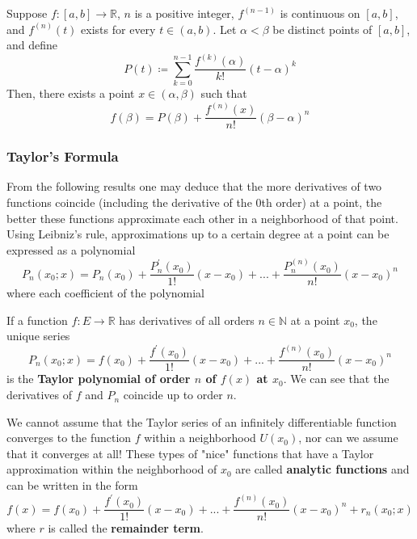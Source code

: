   \begin{theorem}
    Suppose $f: [a, b] \to \mathbb{R}$, $n$ is a positive integer, $f^{(n-1)}$ is continuous on $[a, b]$, and $f^{(n)} (t)$ exists for every $t \in (a, b)$. Let $\alpha < \beta$ be distinct points of $[a, b]$, and define 
    \begin{equation}
      P(t) \coloneqq \sum_{k=0}^{n-1} \frac{f^{(k)}(\alpha)}{k!} (t - \alpha)^k 
    \end{equation}
    Then, there exists a point $x \in (\alpha, \beta)$ such that 
    \begin{equation}
      f(\beta) = P(\beta) + \frac{f^{(n)}(x)}{n!} (\beta - \alpha)^n 
    \end{equation}
  \end{theorem}

\subsubsection{Taylor's Formula}

  From the following results one may deduce that the more derivatives of two functions coincide (including the derivative of the $0$th order) at a point, the better these functions approximate each other in a neighborhood of that point. Using Leibniz's rule, approximations up to a certain degree at a point can be expressed as a polynomial 
  \[P_n (x_0; x) = P_n (x_0) + \frac{P_n^\prime (x_0)}{1!} (x-x_0) + ... + \frac{P_n^{(n)} (x_0)}{n!} (x-x_0)^n\]
  where each coefficient of the polynomial 

  \begin{definition}
    If a function $f:E \longrightarrow \mathbb{R}$ has derivatives of all orders $n \in \mathbb{N}$ at a point $x_0$, the unique series
    \[P_n (x_0; x) = f(x_0) + \frac{f^\prime (x_0)}{1!} (x-x_0) + ... + \frac{f^{(n)} (x_0)}{n!} (x-x_0)^n\]
    is the \textbf{Taylor polynomial of order $n$ of $f(x)$ at $x_0$}. We can see that the derivatives of $f$ and $P_n$ coincide up to order $n$. 
  \end{definition}

  \begin{definition}
    We cannot assume that the Taylor series of an infinitely differentiable function converges to the function $f$ within a neighborhood $U(x_0)$, nor can we assume that it converges at all! These types of "nice" functions that have a Taylor approximation within the neighborhood of $x_0$ are called \textbf{analytic functions} and can be written in the form 
    \[f(x) =  f(x_0) + \frac{f^\prime (x_0)}{1!} (x-x_0) + ... + \frac{f^{(n)} (x_0)}{n!} (x-x_0)^n + r_n (x_0; x)\]
    where $r$ is called the \textbf{remainder term}. 
  \end{definition}

